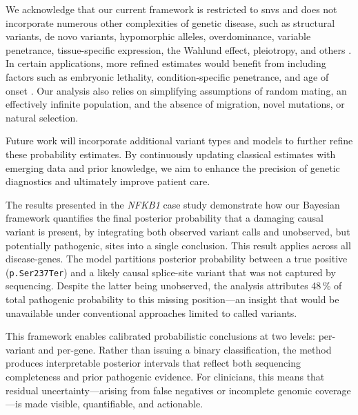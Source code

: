 We acknowledge that our current framework is restricted to \ac{snv}s and does not incorporate numerous other complexities of genetic disease, such as structural variants, de novo variants, hypomorphic alleles, overdominance, variable penetrance, tissue-specific expression, the Wahlund effect, pleiotropy, and others \cite{zschocke_mendelian_2023}. In certain applications, more refined estimates would benefit from including factors such as embryonic lethality, condition-specific penetrance, and age of onset \cite{hannah_using_2024}. Our analysis also relies on simplifying assumptions of random mating, an effectively infinite population, and the absence of migration, novel mutations, or natural selection.

Future work will incorporate additional variant types and models to further refine these probability estimates. By continuously updating classical estimates with emerging data and prior knowledge, we aim to enhance the precision of genetic diagnostics and ultimately improve patient care.







The results presented in the \textit{NFKB1} case study demonstrate how our Bayesian framework quantifies the final posterior probability that a damaging causal variant is present, by integrating both observed variant calls and unobserved, but potentially pathogenic, sites into a single conclusion. 
This result applies across all disease-genes. 
The model partitions posterior probability between a true positive (\texttt{p.Ser237Ter}) and a likely causal splice-site variant that was not captured by sequencing. Despite the latter being unobserved, the analysis attributes 48\,\% of total pathogenic probability to this missing position—an insight that would be unavailable under conventional approaches limited to called variants.

This framework enables calibrated probabilistic conclusions at two levels: per-variant and per-gene. Rather than issuing a binary classification, the method produces interpretable posterior intervals that reflect both sequencing completeness and prior pathogenic evidence. For clinicians, this means that residual uncertainty—arising from false negatives or incomplete genomic coverage—is made visible, quantifiable, and actionable.

